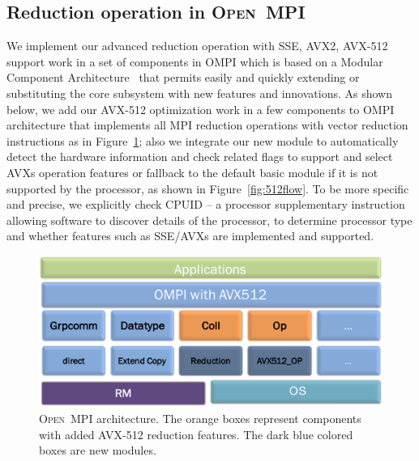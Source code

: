 \documentclass[sigconf]{acmart}
\newcommand{\ompi}[0]{\textsc{Open~MPI}\xspace}
\begin{document}
\subsection{Reduction operation in \ompi}
We implement our advanced reduction operation with SSE, AVX2, AVX-512 support work
in a set of components in OMPI which is based on a Modular Component
Architecture~\cite{dong_prrte} that permits easily and quickly extending or
substituting the core subsystem with new features and innovations.
As shown below, we add our AVX-512 optimization work in a few components to OMPI
architecture that implements all MPI reduction operations with vector reduction instructions as in Figure~\ref{fig:avx_mca}; also we integrate our new module to
automatically detect the hardware information and check related flags to support and select AVXs operation
features or fallback to the default basic module if it is not supported by the
processor, as shown in Figure~\ref{fig:512flow}. To be more specific and precise, we explicitly check CPUID -- a processor
supplementary instruction allowing software to discover details of the processor, to
determine processor type and whether features such as SSE/AVXs are implemented and supported.

\begin{figure}[h]
    \centering
    \includegraphics[width=\linewidth]{avx-mca.pdf}
    \caption{\ompi architecture. The orange boxes represent components with added AVX-512 reduction features. The dark blue colored boxes are new modules.}
    \label{fig:avx_mca}
\end{figure}
\end{document}
